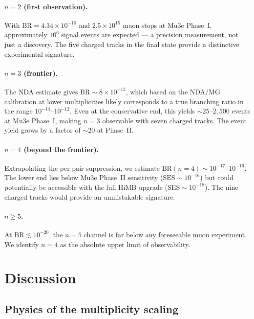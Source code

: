 \documentclass[11pt,a4paper]{article}
\begin{document}
\paragraph{$n = 2$ (first observation).}
With $\text{BR} = 4.34\times10^{-10}$ and $2.5\times10^{15}$ muon
stops at Mu3e Phase~I, approximately $10^6$ signal events are expected
--- a precision measurement, not just a discovery.
The five charged tracks in the final state provide a distinctive
experimental signature.

\paragraph{$n = 3$ (frontier).}
The NDA estimate gives $\text{BR} \sim 8\times10^{-13}$, which based
on the NDA/MG calibration at lower multiplicities likely corresponds to a
true branching ratio in the range $10^{-14}$--$10^{-12}$.
Even at the conservative end, this yields $\sim\!25$--$2{,}500$
events at Mu3e Phase~I, making $n=3$ observable with seven charged
tracks.
The event yield grows by a factor of $\sim\!20$ at Phase~II.

\paragraph{$n = 4$ (beyond the frontier).}
Extrapolating the per-pair suppression, we estimate
$\text{BR}(n\!=\!4) \sim 10^{-17}$--$10^{-16}$.
The lower end lies below Mu3e Phase~II sensitivity
($\text{SES} \sim 10^{-16}$) but could potentially be accessible
with the full HiMB upgrade ($\text{SES} \sim 10^{-18}$).
The nine charged tracks would provide an unmistakable signature.

\paragraph{$n \geq 5$.}
At $\text{BR} \lesssim 10^{-20}$, the $n = 5$ channel is far below
any foreseeable muon experiment.
We identify $n = 4$ as the absolute upper limit of observability.


\section{Discussion}
\label{sec:discussion}

\subsection{Physics of the multiplicity scaling}
\end{document}
